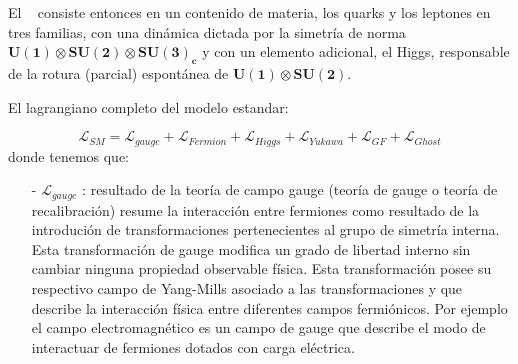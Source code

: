 El \ME ~ consiste entonces en un contenido de materia, los quarks y los leptones en tres familias, con una dinámica dictada por la simetría de norma $\mathbf{U(1) \otimes SU(2) \otimes SU(3)_c}$ y con un elemento adicional, el Higgs, responsable de la rotura (parcial) espontánea de  $\mathbf{U(1) \otimes SU(2)}$.

El lagrangiano completo del modelo estandar:

\begin{equation}
\mathcal{L}_{SM} = \mathcal{L}_{gauge} + \mathcal{L}_{Fermion} + \mathcal{L}_{Higgs} + \mathcal{L}_{Yukawa} + \mathcal{L}_{GF} + \mathcal{L}_{Ghost} 
\end{equation}
donde tenemos que:
\begin{itemize}
\item[-] $\mathcal{L}_{gauge}$ : resultado de la teoría de campo gauge (teoría de gauge o teoría de recalibración) resume la interacción entre fermiones como resultado de la introdución de transformaciones pertenecientes al grupo de simetría interna. Esta transformación de gauge modifica un grado de libertad interno sin cambiar ninguna propiedad observable física. Esta transformación posee su respectivo campo de Yang-Mills asociado a las transformaciones y que describe la interacción física entre diferentes campos fermiónicos. Por ejemplo el campo electromagnético es un campo de gauge que describe el modo de interactuar de fermiones dotados con carga eléctrica. 


\end{itemize}
